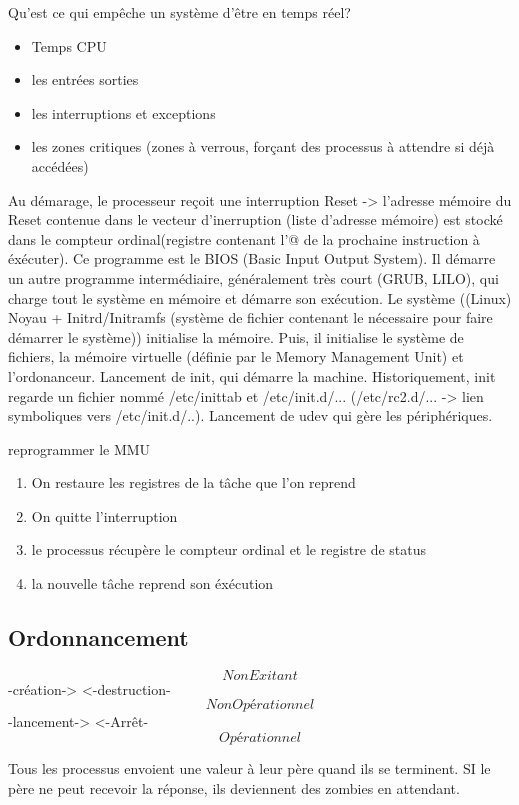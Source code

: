 \documentclass{article}
\begin{document}
Qu'est ce qui empêche un système d'être en temps réel?
\begin{itemize}
	\item Temps CPU
	\item les entrées sorties
	\item les interruptions et exceptions
	\item les zones critiques (zones à verrous, forçant des processus à attendre si déjà accédées)
\end{itemize}

Au démarage, le processeur reçoit une interruption Reset -> l'adresse mémoire du Reset contenue dans le vecteur d'inerruption (liste d'adresse mémoire) est stocké dans le compteur ordinal(registre contenant l'@ de la prochaine instruction à éxécuter). Ce programme est le BIOS (Basic Input Output System). Il démarre un autre programme intermédiaire, généralement très court (GRUB, LILO), qui charge tout le système en mémoire et démarre son exécution.
Le système ((Linux) Noyau + Initrd/Initramfs (système de fichier contenant le nécessaire pour faire démarrer le système)) initialise la mémoire. Puis, il initialise le système de fichiers, la mémoire virtuelle (définie par le Memory Management Unit) et l'ordonanceur. Lancement de init, qui démarre la machine. Historiquement, init regarde un fichier nommé /etc/inittab et /etc/init.d/...  (/etc/rc2.d/... -> lien symboliques vers /etc/init.d/..). Lancement de udev qui gère les périphériques.

reprogrammer le MMU

\begin{enumerate}
	\item On restaure les registres de la tâche que l'on reprend
	\item On quitte l'interruption
	\item le processus récupère le compteur ordinal et le registre de status
	\item la nouvelle tâche reprend son éxécution
\end{enumerate}

\subsection{Ordonnancement}

\[Non Exitant\] -création->  <-destruction- \[Non Opérationnel\] -lancement-> <-Arrêt- \[Opérationnel\]

Tous les processus envoient une valeur à leur père quand ils se terminent. SI le père ne peut recevoir la réponse, ils deviennent des zombies en attendant.
\end{document}

